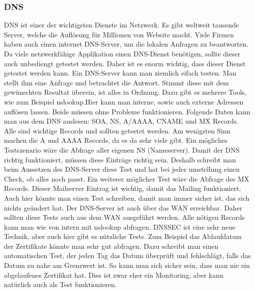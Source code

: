 \documentclass[a4,12pt]{scrartcl}
\begin{document}
\subsubsection{DNS}
DNS ist einer der wichtigsten Dienste im Netzwerk. Es gibt weltweit tausende Server, welche die Auflösung für Millionen von Website macht. Viele Firmen haben auch einen internet DNS-Server, um die lokalen Anfragen zu beantworten. Da viele netzwerkfähige Applikation einen DNS-Dienst benötigen, sollte dieser auch unbediengt getestet werden. Daher ist es enorm wichtig, dass dieser Dienst getestet werden kann.\newline\newline
Ein DNS-Server kann man ziemlich eifach testen. Man stellt ihm eine Anfrage und betrachtet die Antwort. Stimmt diese mit dem gewünschten Resultat überein, ist alles in Ordnung. Dazu gibt es mehrere Tools, wie zum Beispiel nslookup.Hier kann man interne, sowie auch externe Adressen auflösen lassen. Beide müssen ohne Probleme funktionieren.\newline\newline
Folgende Daten kann man aus dem DNS auslesen: SOA, NS, A/AAAA, CNAME und MX Records. Alle sind wichtige Records und sollten getestet werden. Am wenigsten Sinn machen die A und AAAA Records, da es da sehr viele gibt.\newline\newline
Ein mögliches Testszenario wäre die Abfrage aller eigenen NS (Nameserver). Damit der DNS richtig funktioniert, müssen diese Einträge richtig sein. Deshalb schreibt man beim Aussetzen des DNS-Server diese Test und hat bei jeder umstellung einen Check, ob alles noch passt. Ein weiterer möglicher Test wäre die Abfrage des MX Records. Dieser Mailserver Eintrag ist wichtig, damit das Mailing funktioniert. Auch hier könnte man einen Test schreiben, damit man immer sicher ist, das sich nichts geändert hat.\newline\newline
Der DNS-Server ist auch über das WAN erreichbar. Daher sollten diese Tests auch aus dem WAN ausgeführt werden. Alle nötigen Records kann man wie von intern mit nslookup abfragen.\newline\newline
DNSSEC ist eine sehr neue Technik, aber auch hier gibt es nützliche Tests. Zum Beispiel das Ablaufdatum der Zertifikate könnte man sehr gut abfragen. Dazu schreibt man einen automatischen Test, der jeden Tag das Datum überprüft und fehlschlägt, falls das Datum zu nahe am Grenzwert ist. So kann man sich sicher sein, dass man nie ein abgelaufenes Zertifikat hat. Dies ist zwar eher ein Monitoring, aber kann natürlich auch als Test funktionieren.
\end{document}
